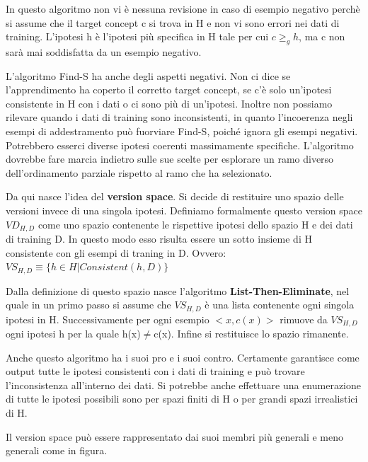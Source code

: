 \documentclass[a4paper]{extarticle}
\begin{document}
In questo algoritmo non vi è nessuna revisione in caso di esempio negativo perchè si assume che il target concept c si trova in H e non vi sono errori nei dati di training. L'ipotesi h è l'ipotesi più specifica in H tale per cui $ c \geq_g h$, ma c non sarà mai soddisfatta da un esempio negativo.

L'algoritmo Find-S ha anche degli aspetti negativi. Non ci dice se l'apprendimento ha coperto il corretto target concept, se c'è solo un'ipotesi consistente in H con i dati o ci sono più di un'ipotesi. Inoltre non possiamo rilevare quando i dati di training sono inconsistenti, in quanto l'incoerenza negli esempi di addestramento può fuorviare Find-S, poiché ignora gli esempi negativi. Potrebbero esserci diverse ipotesi coerenti massimamente specifiche. L'algoritmo dovrebbe fare marcia indietro sulle sue scelte per esplorare un ramo diverso dell'ordinamento parziale rispetto al ramo che ha selezionato.

Da qui nasce l'idea del \textbf{version space}. Si decide di restituire uno spazio delle versioni invece di una singola ipotesi. Definiamo formalmente questo version space $VD_{H,D}$ come uno spazio contenente le rispettive ipotesi dello spazio H e dei dati di training D. In questo modo esso risulta essere un sotto insieme di H consistente con gli esempi di traning in D. Ovvero: $VS_{H,D} \equiv \{ h \in H | Consistent(h,D)\}$

Dalla definizione di questo spazio nasce l'algoritmo \textbf{List-Then-Eliminate}, nel quale in un primo passo si assume che $VS_{H,D}$ è una lista contenente ogni singola ipotesi in H. Successivamente per ogni esempio $<x,c(x)>$ rimuove da $VS_{H,D}$ ogni ipotesi h per la quale h(x)$\not =$c(x). Infine si restituisce lo spazio rimanente.

Anche questo algoritmo ha i suoi pro e i suoi contro. Certamente garantisce come output tutte le ipotesi consistenti con i dati di training e può trovare l'inconsistenza all'interno dei dati. Si potrebbe anche effettuare una enumerazione di tutte le ipotesi possibili sono per spazi finiti di H o per grandi spazi irrealistici di H.

Il version space può essere rappresentato dai suoi membri più generali e meno generali come in figura.

\begin{center}


\end{center}
\end{document}
